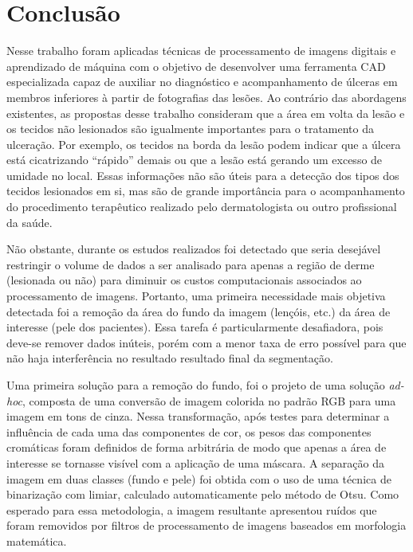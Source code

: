 \section{Conclusão}\label{sec:conclusion}

Nesse trabalho foram  aplicadas técnicas de processamento de imagens digitais e aprendizado de máquina com o objetivo de desenvolver uma ferramenta CAD especializada capaz de auxiliar no diagnóstico e acompanhamento de úlceras em membros inferiores à partir de fotografias das lesões.
Ao contrário das abordagens existentes, as propostas desse trabalho consideram que a área em volta da lesão e os tecidos não lesionados são igualmente importantes para o tratamento da ulceração.
Por exemplo, os tecidos na borda da lesão podem indicar que a úlcera está cicatrizando ``rápido'' demais ou que a lesão está gerando um excesso de umidade no local.
Essas informações não são úteis para a detecção dos tipos dos tecidos lesionados em si, mas são de grande importância para o acompanhamento do procedimento terapêutico realizado pelo dermatologista ou outro profissional da saúde.

Não obstante, durante os estudos realizados foi detectado que seria desejável restringir o volume de dados a ser analisado para apenas a região de derme (lesionada ou não) para diminuir os custos computacionais associados ao processamento de imagens.
Portanto, uma primeira necessidade mais objetiva detectada foi a remoção da área do fundo da imagem (lençóis, etc.) da área de interesse (pele dos pacientes). 
Essa tarefa é particularmente desafiadora, pois deve-se remover dados inúteis, porém com a menor taxa de erro possível para que não haja interferência no resultado resultado final da segmentação.

Uma primeira solução para a remoção do fundo, foi o projeto de uma solução \textit{ad-hoc}, composta de uma conversão de imagem colorida no padrão RGB para uma imagem em tons de cinza. 
Nessa transformação, após testes para determinar a influência de cada uma das componentes de cor, os pesos das componentes cromáticas foram definidos de forma arbitrária de modo que apenas a área de interesse se tornasse visível com a aplicação de uma máscara.
A separação da imagem em duas classes (fundo e pele) foi obtida com o uso de uma técnica de binarização com limiar, calculado automaticamente pelo método de Otsu.
Como esperado para essa metodologia, a imagem resultante apresentou ruídos que foram removidos por filtros de processamento de imagens baseados em morfologia matemática. 

